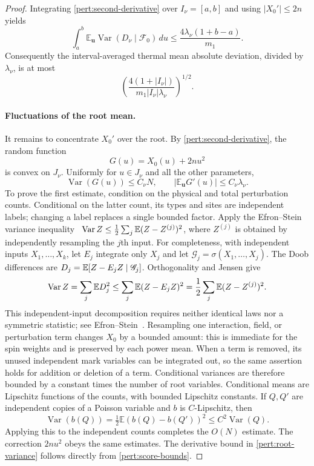 \begin{proof}
Integrating \eqref{pert:second-derivative} over $I_\nu=[a,b]$ and using
$|X_0'|\leq2n$ yields
\begin{equation}
 \int_a^b\mathbb E_{\mathbf u}
       \operatorname{Var}(D_\nu\mid\mathscr F_0)\,du
 \leq\frac{4\lambda_\nu(1+b-a)}{m_1}.
 \label{pert:thermal-variance}
\end{equation}
Consequently the interval-averaged thermal mean absolute deviation,
divided by $\lambda_\nu$, is at most
\begin{equation}
 \left(\frac{4(1+|I_\nu|)}
 {m_1|I_\nu|\lambda_\nu}\right)^{1/2}.
 \label{pert:thermal-bound}
\end{equation}

\paragraph{Fluctuations of the root mean.}
It remains to concentrate $X_0'$ over the root. By
\eqref{pert:second-derivative}, the random function
\[
 G(u)=X_0(u)+2nu^2
\]
is convex on $J_\nu$.  Uniformly for $u\in J_\nu$ and all the other
parameters,
\begin{equation}
 \operatorname{Var}(G(u))\leq C_\nu N,
 \qquad |\mathbb E_{\mathbf u}G'(u)|\leq C_\nu\lambda_\nu.
 \label{pert:root-variance}
\end{equation}
To prove the first estimate, condition on the physical and total
perturbation counts. Conditional on the latter count, its types and sites
are independent labels; changing a label replaces a single bounded
factor. Apply the Efron--Stein variance inequality~\cite{EfronStein}
$\operatorname{Var} Z\le\frac12\sum_j\mathbb E(Z-Z^{(j)})^2$, where $Z^{(j)}$ is obtained
by independently resampling the $j$th input. For completeness, with
independent inputs $X_1,\ldots,X_k$, let $E_j$ integrate only $X_j$ and
let $\mathscr G_j=\sigma(X_1,\ldots,X_j)$. The Doob differences are
$D_j=\mathbb E[Z-E_jZ\mid\mathscr G_j]$. Orthogonality and Jensen give
\[
 \operatorname{Var} Z=\sum_j\mathbb E D_j^2
 \le\sum_j\mathbb E(Z-E_jZ)^2
 =\frac12\sum_j\mathbb E(Z-Z^{(j)})^2.
\]
This independent-input decomposition requires neither identical laws
nor a symmetric statistic; see Efron--Stein~\cite[Section~2]{EfronStein}.
Resampling one interaction, field, or
perturbation term changes $X_0$ by a bounded amount: this is immediate
for the spin weights and is preserved by each power mean.  When a term
is removed, its unused independent mark variables can be integrated
out, so the same assertion holds for addition or deletion of a term.
Conditional variances are therefore bounded by a constant times the
number of root variables.  Conditional means are Lipschitz functions
of the counts, with bounded Lipschitz constants.  If $Q,Q'$ are
independent copies of a Poisson variable and $b$ is $C$-Lipschitz, then
\[
 \operatorname{Var}(b(Q))
 =\tfrac12\mathbb E(b(Q)-b(Q'))^2
 \leq C^2\operatorname{Var}(Q).
\]
Applying this to the independent counts completes the $O(N)$ estimate.
The correction $2nu^2$ obeys the same estimates.  The derivative bound
in \eqref{pert:root-variance} follows directly from
\eqref{pert:score-bounds}.


\end{proof}
